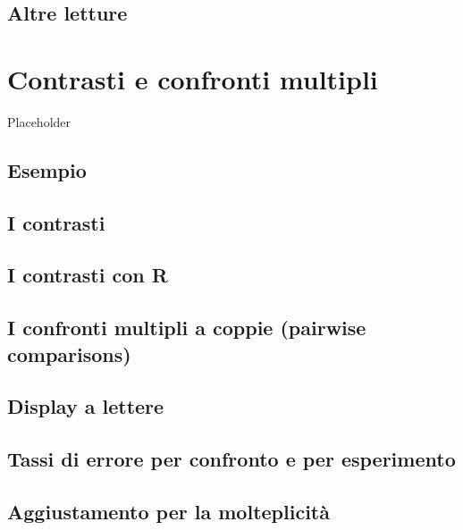 \documentclass[a4paper,12pt,oneside]{book}
\begin{document}
\hypertarget{altre-letture-7}{%
\section{Altre letture}\label{altre-letture-7}}

\hypertarget{contrasti-e-confronti-multipli}{%
\chapter{Contrasti e confronti multipli}\label{contrasti-e-confronti-multipli}}

Placeholder

\hypertarget{esempio}{%
\section{Esempio}\label{esempio}}

\hypertarget{i-contrasti}{%
\section{I contrasti}\label{i-contrasti}}

\hypertarget{i-contrasti-con-r}{%
\section{I contrasti con R}\label{i-contrasti-con-r}}

\hypertarget{i-confronti-multipli-a-coppie-pairwise-comparisons}{%
\section{I confronti multipli a coppie (pairwise comparisons)}\label{i-confronti-multipli-a-coppie-pairwise-comparisons}}

\hypertarget{display-a-lettere}{%
\section{Display a lettere}\label{display-a-lettere}}

\hypertarget{tassi-di-errore-per-confronto-e-per-esperimento}{%
\section{Tassi di errore per confronto e per esperimento}\label{tassi-di-errore-per-confronto-e-per-esperimento}}

\hypertarget{aggiustamento-per-la-molteplicituxe0}{%
\section{Aggiustamento per la molteplicità}\label{aggiustamento-per-la-molteplicituxe0}}
\end{document}
